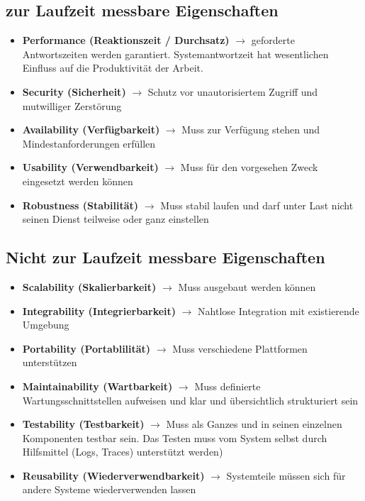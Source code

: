 \documentclass{report}
\theoremstyle{definition}
\theoremstyle{example}
\begin{document}
\subsection{zur Laufzeit messbare Eigenschaften}
\begin{itemize}
	\item \textbf{Performance (Reaktionszeit / Durchsatz)} $\rightarrow$ geforderte Antwortszeiten werden garantiert. Systemantwortzeit hat wesentlichen Einfluss auf die Produktivität der Arbeit.
	\item \textbf{Security (Sicherheit)} $\rightarrow$ Schutz vor unautorisiertem Zugriff und mutwilliger Zerstörung
	\item \textbf{Availability (Verfügbarkeit)} $\rightarrow$ Muss zur Verfügung stehen und Mindestanforderungen erfüllen
	\item \textbf{Usability (Verwendbarkeit)} $\rightarrow$ Muss für den vorgesehen Zweck eingesetzt werden können
	\item \textbf{Robustness (Stabilität)} $\rightarrow$ Muss stabil laufen und darf unter Last nicht seinen Dienst teilweise oder ganz einstellen
\end{itemize}

\subsection{Nicht zur Laufzeit messbare Eigenschaften}
\begin{itemize}
	\item \textbf{Scalability (Skalierbarkeit)} $\rightarrow$ Muss ausgebaut werden können
	\item \textbf{Integrability (Integrierbarkeit)} $\rightarrow$ Nahtlose Integration mit existierende Umgebung
	\item  \textbf{Portability (Portablilität)} $\rightarrow$ Muss verschiedene Plattformen unterstützen
	\item \textbf{Maintainability (Wartbarkeit)} $\rightarrow$ Muss definierte Wartungsschnittstellen aufweisen und klar und übersichtlich strukturiert sein
	\item \textbf{Testability (Testbarkeit)} $\rightarrow$ Muss als Ganzes und in seinen einzelnen Komponenten testbar sein. Das Testen muss vom System selbst durch Hilfsmittel (Logs, Traces) unterstützt werden)
	\item \textbf{Reusability (Wiederverwendbarkeit)} $\rightarrow$ Systemteile müssen sich für andere Systeme wiederverwenden lassen
\end{itemize}
\end{document}
